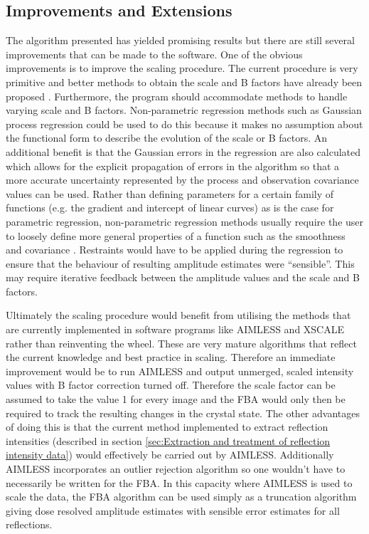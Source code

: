\subsection{Improvements and Extensions}
\label{sub:Improvements and Extensions}
The algorithm presented has yielded promising results but there are still several improvements that can be made to the software.
One of the obvious improvements is to improve the scaling procedure.
The current procedure is very primitive and better methods to obtain the scale and B factors have already been proposed \cite{popov2003}.
Furthermore, the program should accommodate methods to handle varying scale and B factors.
Non-parametric regression methods such as Gaussian process regression could be used to do this because it makes no assumption about the functional form to describe the evolution of the scale or B factors.
An additional benefit is that the Gaussian errors in the regression are also calculated which allows for the explicit propagation of errors in the algorithm so that a more accurate uncertainty represented by the process and observation covariance values can be used.
Rather than defining parameters for a certain family of functions (e.g. the gradient and intercept of linear curves) as is the case for parametric regression, non-parametric regression methods usually require the user to loosely define more general properties of a function such as the smoothness and covariance \cite{rasmussen2006gaussian}.
Restraints would have to be applied during the regression to ensure that the behaviour of resulting amplitude estimates were ``sensible''.
This may require iterative feedback between the amplitude values and the scale and B factors.

Ultimately the scaling procedure would benefit from utilising the methods that are currently implemented in software programs like AIMLESS and XSCALE rather than reinventing the wheel.
These are very mature algorithms that reflect the current knowledge and best practice in scaling.
Therefore an immediate improvement would be to run AIMLESS and output unmerged, scaled intensity values with B factor correction turned off.
Therefore the scale factor can be assumed to take the value 1 for every image and the FBA would only then be required to track the resulting changes in the crystal state.
The other advantages of doing this is that the current method implemented to extract reflection intensities (described in section \ref{sec:Extraction and treatment of reflection intensity data}) would effectively be carried out by AIMLESS.
Additionally AIMLESS incorporates an outlier rejection algorithm so one wouldn't have to necessarily be written for the FBA.
In this capacity where AIMLESS is used to scale the data, the FBA algorithm can be used simply as a truncation algorithm giving dose resolved amplitude estimates with sensible error estimates for all reflections.

